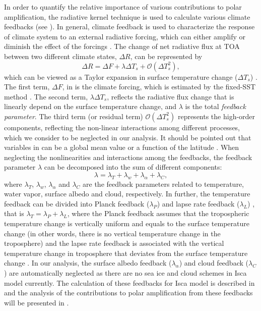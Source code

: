 In order to quantify the relative importance of various contributions to polar amplification, the radiative kernel technique \citep{Soden2008,Shell2008} is used to calculate various climate feedbacks (see ). In general, climate feedback is used to characterize the response of climate system to an external radiative forcing, which can either amplify or diminish the effect of the forcings \citep{Hansen1984}. The change of net radiative flux at TOA between two different climate states, $\Delta R$, can be represented by
\begin{equation}
    \Delta R = \Delta F+\lambda \Delta T_s + \mathcal{O}\left( \Delta T_s^2 \right),
\label{eq:delta_R_relation}
\end{equation}
which can be viewed as a Taylor expansion in surface temperature change ($\Delta T_s$) \citep{Feldl2013a}. The first term, $\Delta F$, in  is the climate forcing, which is estimated by the fixed-SST method \citep{Hansen2005,Feldl2013a,Kim2018}. The second term, $\lambda \Delta T_s$, reflects the radiative flux change that is linearly depend on the surface temperature change, and $\lambda$ is the total \textit{feedback parameter}. The third term (or residual term) $ \mathcal{O}\left(\Delta T_s^2 \right)$ represents the high-order components, reflecting the non-linear interactions among different processes, which we consider to be neglected in our analysis. It should be pointed out that variables in  can be a global mean value or a function of the latitude \citep{Feldl2013a}. When neglecting the nonlinearities and interactions among the feedbacks, the feedback parameter $\lambda$ can be decomposed into the sum of different components:
\begin{equation}
\lambda=\lambda_T+\lambda_{w} +\lambda_\alpha+\lambda_C,
\label{eq:fb_decmop}
\end{equation}
where $\lambda_T$, $\lambda_{w}$, $\lambda_\alpha$ and $\lambda_C$ are the feedback parameters related to temperature, water vapor, surface albedo and cloud, respectively. In further, the temperature feedback can be divided into Planck feedback ($\lambda_P$) and lapse rate  feedback ($\lambda_L$) \citep{Soden2006}, that is $\lambda_T=\lambda_P+\lambda_L$, where the Planck feedback assumes that the tropospheric temperature change is vertically uniform and equals to the surface temperature change (in other words, there is no vertical temperature change in the troposphere) and the lapse rate feedback is associated with the vertical temperature change in troposphere that deviates from the surface temperature change \citep{Bony2006,Soden2006,Feldl2017coupled}. In our analysis, the surface albedo feedback ($\lambda_\alpha$) and cloud feedback ($\lambda_C$) are automatically neglected as there are no sea ice and cloud schemes in Isca model currently. The calculation of these feedbacks for Isca model is described in  and the analysis of the contributions to polar amplification from these feedbacks will be presented in .

